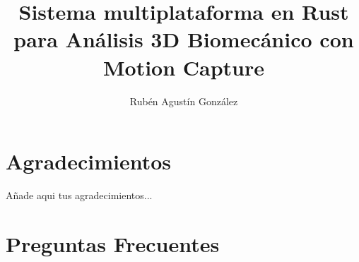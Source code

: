 
\newcommand{\pfg}{Proyecto Fin de Grado }

\title{Sistema multiplataforma en Rust para Análisis 3D 
Biomecánico con Motion Capture}
\author{Rubén Agustín González}



\hypersetup{pageanchor=false}
\begin{titlepage}
    \thispagestyle{empty}
    
\end{titlepage}

\listoftodos

\newpage
\begin{abstract}
    
\end{abstract}
\renewcommand{\abstractname}{Abstract} %
\newpage
\vspace{10cm}
\begin{abstract}
    
\end{abstract}

\chapter*{Agradecimientos}
\noindent Añade aqui tus agradecimientos...

\hypersetup{pageanchor=false}
\hypersetup{linkcolor=black}
\tableofcontents

\listoffigures
\listoftables
\lstlistoflistings












\label{sec:bibliografía}
\printbibliography

\appendix
\label{sec:apendice}
\chapter{Preguntas Frecuentes}






